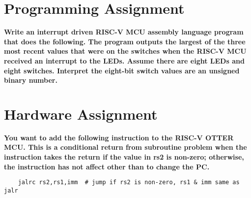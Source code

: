 \documentclass{article}
\begin{document}
\pagebreak

\section{Programming Assignment}
\textbf{Write an interrupt driven RISC-V MCU assembly language program that does the following. The program outputs the largest of the three most recent values that were on the switches when the RISC-V MCU received an interrupt to the LEDs. Assume there are eight LEDs and eight switches. Interpret the eight-bit switch values are an unsigned binary number.}


\pagebreak

\section{Hardware Assignment}

\textbf{You want to add the following instruction to the RISC-V OTTER MCU. This is a conditional return from subroutine problem when the instruction takes the return if the value in rs2 is non-zero; otherwise, the instruction has not affect other than to change the PC. }

\begin{verbatim}
    jalrc rs2,rs1,imm  # jump if rs2 is non-zero, rs1 & imm same as jalr
\end{verbatim}
\end{document}
